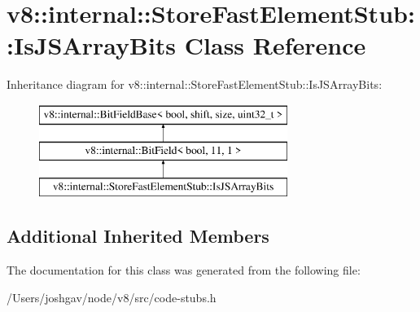 \hypertarget{classv8_1_1internal_1_1_store_fast_element_stub_1_1_is_j_s_array_bits}{}\section{v8\+:\+:internal\+:\+:Store\+Fast\+Element\+Stub\+:\+:Is\+J\+S\+Array\+Bits Class Reference}
\label{classv8_1_1internal_1_1_store_fast_element_stub_1_1_is_j_s_array_bits}
Inheritance diagram for v8\+:\+:internal\+:\+:Store\+Fast\+Element\+Stub\+:\+:Is\+J\+S\+Array\+Bits\+:\begin{figure}[H]
\begin{center}
\leavevmode
\includegraphics[height=3.000000cm]{classv8_1_1internal_1_1_store_fast_element_stub_1_1_is_j_s_array_bits}
\end{center}
\end{figure}
\subsection*{Additional Inherited Members}


The documentation for this class was generated from the following file\+:\begin{DoxyCompactItemize}
\item 
/\+Users/joshgav/node/v8/src/code-\/stubs.\+h\end{DoxyCompactItemize}
